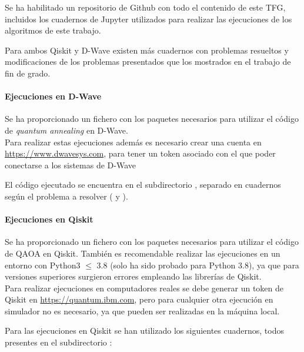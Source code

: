 Se ha habilitado un repositorio de Github\cite{codigo_tfg} con todo el contenido de este TFG, incluidos los cuadernos de Jupyter utilizados para realizar las ejecuciones de los algoritmos de este trabajo.

Para ambos Qiskit y D-Wave existen más cuadernos con problemas resueltos y modificaciones de los problemas presentados que los mostrados en el trabajo de fin de grado.

\paragraph{Ejecuciones en D-Wave}

Se ha proporcionado un fichero  con los paquetes necesarios para utilizar el código de \textit{quantum annealing} en D-Wave.
\\
Para realizar estas ejecuciones además es necesario crear una cuenta en \url{https://www.dwavesys.com}, para tener un token asociado con el que poder conectarse a los sistemas de D-Wave

El código ejecutado se encuentra en el subdirectorio , separado en cuadernos según el problema a resolver ( y ).

\paragraph{Ejecuciones en Qiskit}

Se ha proporcionado un fichero  con los paquetes necesarios para utilizar el código de QAOA en Qiskit.
También es recomendable realizar las ejecuciones en un entorno con Python3 $\le$ 3.8 (solo ha sido probado para Python 3.8), ya que para versiones superiores surgieron errores empleando las librerías de Qiskit.
\\
Para realizar ejecuciones en computadores reales se debe generar un token de Qiskit en \url{https://quantum.ibm.com}, pero para cualquier otra ejecución en simulador no es necesario, ya que pueden ser realizadas en la máquina local.

Para las ejecuciones en Qiskit se han utilizado los siguientes cuadernos, todos presentes en el subdirectorio :

